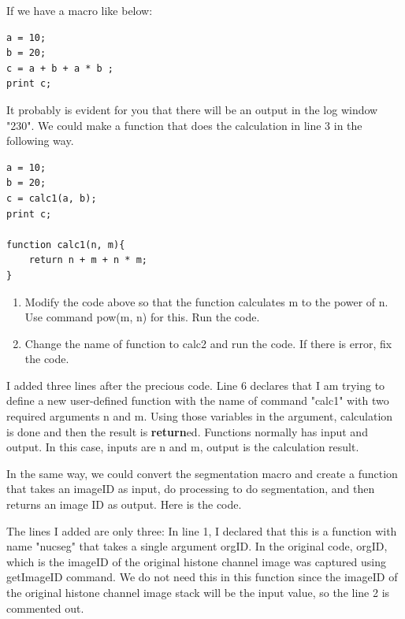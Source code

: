 If we have a macro like below:

\begin{lstlisting}
a = 10;
b = 20;
c = a + b + a * b ;
print c;
\end{lstlisting}

It probably is evident for you that there will be an output in the log window "230". We could make a function that does the calculation in line 3 in the following way.

\begin{lstlisting}[morekeywords={*, function, return}]
a = 10;
b = 20;
c = calc1(a, b);
print c;

function calc1(n, m){
	return n + m + n * m;
}
\end{lstlisting}

\begin{indentexercise}{3}
\begin{enumerate}
\item Modify the code above so that the function calculates m to the power of n. Use command pow(m, n) for this. Run the code. 

\item Change the name of function to calc2 and run the code. If there is error, fix the code. 
\end{enumerate}

\end{indentexercise}

I added three lines after the precious code. Line 6 declares that I am trying to define a new user-defined function with the name of command "calc1" with two required arguments n and m. Using those variables in the argument, calculation is done and then the result is \textbf{return}ed. Functions normally has input and output. In this case, inputs are n and m, output is the calculation result. 

In the same way, we could convert the segmentation macro and create a function that takes an imageID as input, do processing to do segmentation, and then returns an image ID as output. Here is the code. 



The lines I added are only three: In line 1, I declared that this is a function with name "nucseg" that takes a single argument orgID. In the original code, orgID, which is the imageID of the original histone channel image was captured using getImageID command. We do not need this in this function since the imageID of the original histone channel image stack will be the input value, so the line 2 is commented out. 

